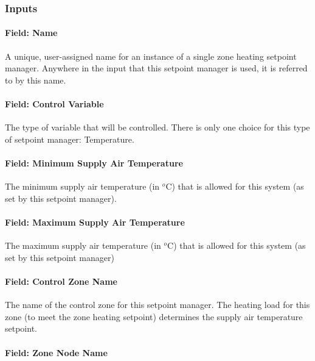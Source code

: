 \subsubsection{Inputs}\label{inputs-4-030}

\paragraph{Field: Name}\label{field-name-4-026}

A unique, user-assigned name for an instance of a single zone heating setpoint manager. Anywhere in the input that this setpoint manager is used, it is referred to by this name.

\paragraph{Field: Control Variable}\label{field-control-variable-4}

The type of variable that will be controlled. There is only one choice for this type of setpoint manager: Temperature.

\paragraph{Field: Minimum Supply Air Temperature}\label{field-minimum-supply-air-temperature-1}

The minimum supply air temperature (in \(^{o}\)C) that is allowed for this system (as set by this setpoint manager).

\paragraph{Field: Maximum Supply Air Temperature}\label{field-maximum-supply-air-temperature-1}

The maximum supply air temperature (in \(^{o}\)C) that is allowed for this system (as set by this setpoint manager)

\paragraph{Field: Control Zone Name}\label{field-control-zone-name-1}

The name of the control zone for this setpoint manager. The heating load for this zone (to meet the zone heating setpoint) determines the supply air temperature setpoint.

\paragraph{Field: Zone Node Name}\label{field-zone-node-name-1-000}

